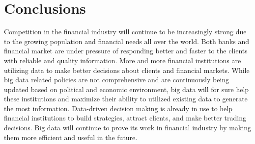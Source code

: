 \documentclass[sigconf]{acmart}
\begin{document}
\section{Conclusions}
Competition in the financial industry will continue to be increasingly strong due to the growing population and financial needs all over the world. \cite{Turner2013} Both banks and financial market are under pressure of responding better and faster to the clients with reliable and quality information. More and more financial institutions are utilizing data to make better decisions about clients and financial markets.\cite{Stackowiak2015} While big data related policies are not comprehensive and are continuously being updated based on political and economic environment, big data will for sure help these institutions and maximize their ability to utilized existing data to generate the most information. Data-driven decision making is already in use to help financial institutions to build strategies, attract clients, and make better trading decisions. Big data will continue to prove its work in financial industry by making them more efficient and useful in the future. 





 
\end{document}
